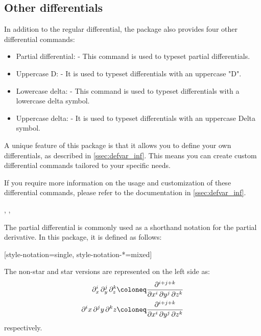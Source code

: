 \subsection{Other differentials}
In addition to the regular differential, the package also provides four other differential commands:
\begin{itemize}
	\item Partial differential: \macro{\pdif} - This command is used to typeset partial differentials.
	\item Uppercase D: \macro{\mdif} - It is used to typeset differentials with an uppercase "D".
	\item Lowercase delta: \macro{\fdif} - This command is used to typeset differentials with a lowercase delta symbol.
	\item Uppercase delta: \macro{\adif} - It is used to typeset differentials with an uppercase Delta symbol.
\end{itemize}
A unique feature of this package is that it allows you to define your own differentials, as described in \cref{ssec:defvar_inf}. This means you can create custom differential commands tailored to your specific needs.

If you require more information on the usage and customization of these differential commands, please refer to the documentation in \cref{ssec:defvar_inf}.


\begin{function}{\pdif}
	\begin{syntax}
		\sarg, , 
	\end{syntax}
	The partial differential  is commonly used as a shorthand notation for the partial derivative. In this package, it is defined as follows:
	\begin{definition}
		\DeclareDifferential{\pdif}{\partial}[style-notation=single,
		style-notation-*=mixed]
	\end{definition}

	\noindent The non-star and star versions are represented on the left side as:
	\begin{align*}
		\pdif[order={i,j,k}]{x,y,z} &\coloneq \pdv[order={i,j,k}]{}{x,y,z} \\
		\pdif*[order={i,j,k}]{x,y,z} &\coloneq \pdv[order={i,j,k}]{}{x,y,z}
	\end{align*}
	respectively.
\end{function}

